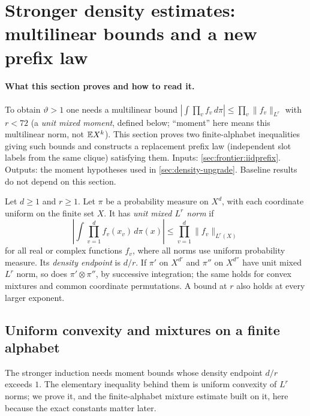 \section{Stronger density estimates: multilinear bounds and a new prefix law}
\label{sec:density:moments-prefix}

\paragraph{What this section proves and how to read it.}
To obtain $\vartheta>1$ one needs a multilinear bound
$|\int\prod_vf_v\,d\pi|\le\prod_v\|f_v\|_{L^r}$ with $r<72$
(a \emph{unit mixed moment}, defined below; ``moment'' here means
this multilinear norm, not $\mathbb E X^k$). This section proves two
finite-alphabet inequalities giving such bounds and constructs a
replacement prefix law (independent slot labels from the same
clique) satisfying them. Inputs: \cref{sec:frontier:iidprefix}.
Outputs: the moment hypotheses used in \cref{sec:density-upgrade}.
Baseline results do not depend on this section.

\begin{definition}\label{def:density:mixed-moment}
Let $d\ge1$ and $r\ge1$. Let $\pi$ be a probability measure on $X^d$, with each coordinate uniform
on the finite set $X$. It has \emph{unit mixed $L^r$ norm} if
\[
 \left|\int\prod_{v=1}^d f_v(x_v)\,d\pi(x)\right|
 \le\prod_{v=1}^d\|f_v\|_{L^r(X)}
\]
for all real or complex functions $f_v$, where all norms use uniform
probability measure. Its \emph{density endpoint} is $d/r$. If $\pi'$ on $X^{d'}$ and $\pi''$ on $X^{d''}$ have unit mixed $L^r$ norm, so does $\pi'\otimes\pi''$, by successive integration; the same holds for convex mixtures and common coordinate permutations. A bound at $r$ also holds at every larger exponent.
\end{definition}

\subsection{Uniform convexity and mixtures on a finite alphabet}

The stronger induction needs moment bounds whose density endpoint $d/r$ exceeds $1$. The elementary inequality behind them is uniform
convexity of $L^r$ norms; we prove it, and the finite-alphabet
mixture estimate built on it, here because the exact constants
matter later.

